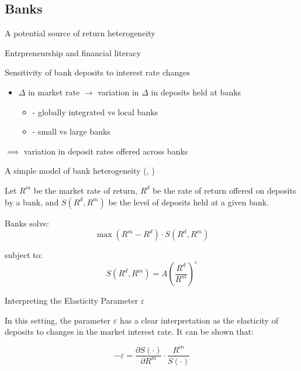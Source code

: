 \documentclass{beamer}
\begin{document}
\subsection{Banks}
\begin{frame}{A potential source of return heterogeneity}
  \par Entrpreneurship and financial literacy
  \par Sensitivity of bank deposits to interest rate changes
  \begin{itemize}
  \item $\Delta$ in market rate $\rightarrow$ variation in $\Delta$ in deposits held at banks
    \begin{itemize}
  \item \cite{Sarkisyan2021} - globally integrated vs local banks
  \item \cite{d'Avernas2024} - small vs large banks
    \end{itemize}
  \end{itemize}

  $\implies$ variation in deposit rates offered across banks
  \end{frame}

\begin{frame}[label=bankmodel]{A simple model of bank heterogeneity (\cite{Monti1972}, \cite{Klein1971})}

\par Let $R^m$ be the market rate of return, $R^d$ be the rate of return offered on deposits by a  bank, and $S(R^d, R^m)$ be the level of deposits held at a given bank.

\par Banks solve:
\[
\max (R^m - R^d) \cdot S(R^d, R^m)
\]

\par subject to:
\[
S(R^d, R^m) = A \left( \frac{R^d}{R^m} \right)^{\varepsilon}
\]

\vspace{1em}
\hyperlink{epsilonslide}{}

\end{frame}

\begin{frame}[label=epsilonslide]{Interpreting the Elasticity Parameter $\varepsilon$}

\small
\par In this setting, the parameter $\varepsilon$ has a clear interpretation as the elasticity of deposits to changes in the market interest rate. It can be shown that:

\[
-\varepsilon = \frac{\partial S(\cdot)}{\partial R^m} \cdot \frac{R^m}{S(\cdot)}
\]

\vspace{1em}
\hyperlink{bankmodel}{}

\vspace{1em}
\hyperlink{focslide}{}

\end{frame}
\end{document}
